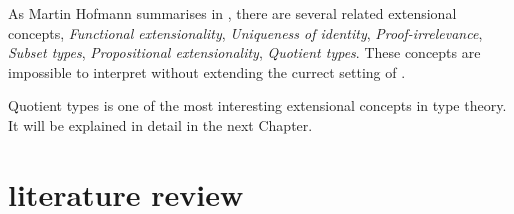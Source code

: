 As Martin Hofmann summarises in \cite{hof:phd}, there are several related extensional concepts, \emph{Functional extensionality}, \emph{Uniqueness of identity}, \emph{Proof-irrelevance}, \emph{Subset types}, \emph{Propositional extensionality}, \emph{Quotient types}. These concepts are impossible to interpret without extending the currect setting of \itt{}.

Quotient types is one of the most interesting extensional concepts in type theory. It will be explained in detail in the next Chapter.



\section{literature review}
